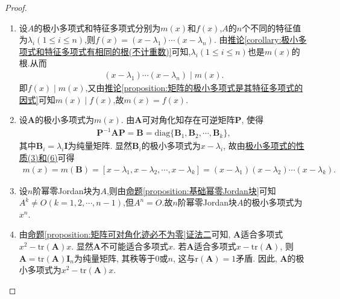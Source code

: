 \documentclass[../../main.tex]{subfiles}%
\begin{document}
\begin{proof}
\begin{enumerate}[(1)]
\item 设$A$的极小多项式和特征多项式分别为$m(x)$和$f(x)$,$A$的$n$个不同的特征值为$\lambda_i(1\leqslant  i\leqslant  n)$,则$f(x)=(x-\lambda_1)\cdots(x-\lambda_n)$.
由\hyperref[corollary:极小多项式和特征多项式有相同的根(不计重数)]{推论\ref{corollary:极小多项式和特征多项式有相同的根(不计重数)}}可知,$\lambda_i(1\leqslant  i\leqslant  n)$也是$m(x)$的根.从而
\begin{align*}
(x-\lambda_1)\cdots(x-\lambda_n)\mid m(x).
\end{align*}
即$f(x)\mid m(x)$,又由\hyperref[proposition:矩阵的极小多项式是其特征多项式的因式]{推论\ref{proposition:矩阵的极小多项式是其特征多项式的因式}}可知$m(x)\mid f(x)$,故$m(x)=f(x)$.

\item 设\(\boldsymbol{A}\)的极小多项式为\(m(x)\). 由\(\boldsymbol{A}\)可对角化知存在可逆矩阵\(\boldsymbol{P}\), 使得
\begin{align*}
\boldsymbol{P}^{-1}\boldsymbol{A}\boldsymbol{P} = \boldsymbol{B} = \mathrm{diag}\{\boldsymbol{B}_1,\boldsymbol{B}_2,\cdots,\boldsymbol{B}_k\},
\end{align*}
其中\(\boldsymbol{B}_i = \lambda_i\boldsymbol{I}\)为纯量矩阵. 显然\(\boldsymbol{B}_i\)的极小多项式为\(x - \lambda_i\), 故由\hyperref[proposition:极小多项式的性质]{极小多项式的性质(3)和(6)}可得
\begin{align*}
m(x) = m(\boldsymbol{B})= [x - \lambda_1,x - \lambda_2,\cdots,x - \lambda_k] = (x - \lambda_1)(x - \lambda_2)\cdots(x - \lambda_k). 
\end{align*} 

\item 设\(n\)阶幂零Jordan块为$A$,则由\hyperref[proposition:基础幂零Jordan块]{命题\ref{proposition:基础幂零Jordan块}}可知$A^k\ne O(k=1,2,\cdots,n-1)$,但$A^n=O$.故\(n\)阶幂零Jordan块$A$的极小多项式为$x^n$.

\item 由\hyperref[proposition:矩阵可对角化迹必不为零]{命题\ref{proposition:矩阵可对角化迹必不为零}证法二}可知, \(\boldsymbol{A}\)适合多项式\(x^2 - \mathrm{tr}(\boldsymbol{A})x\). 显然\(\boldsymbol{A}\)不可能适合多项式\(x\). 若\(\boldsymbol{A}\)适合多项式\(x - \mathrm{tr}(\boldsymbol{A})\), 则\(\boldsymbol{A} = \mathrm{tr}(\boldsymbol{A})\boldsymbol{I}_n\)为纯量矩阵, 其秩等于\(0\)或\(n\), 这与\(\mathrm{r}(\boldsymbol{A}) = 1\)矛盾. 因此, \(\boldsymbol{A}\)的极小多项式为\(x^2 - \mathrm{tr}(\boldsymbol{A})x\). 
\end{enumerate}

\end{proof}
\end{document}

